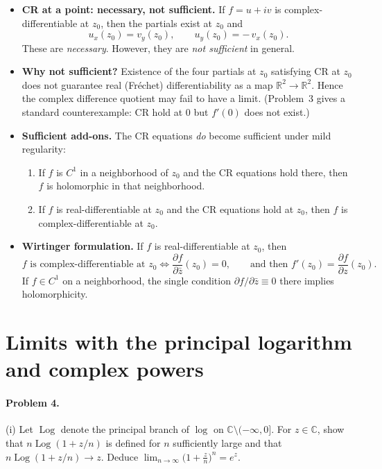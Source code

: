 \documentclass[11pt,a4paper]{article}
\theoremstyle{definition}
\theoremstyle{definition}
\theoremstyle{plain}
\theoremstyle{remark}
\DeclareMathOperator{\Log}{Log}
\begin{document}
\begin{itemize}
	\item \textbf{CR at a point: necessary, not sufficient.}
	If $f=u+iv$ is complex-differentiable at $z_0$, then the partials exist at $z_0$ and
	\[
	u_x(z_0)=v_y(z_0),\qquad u_y(z_0)=-\,v_x(z_0).
	\]
	These are \emph{necessary}. However, they are \emph{not sufficient} in general.
	
	\item \textbf{Why not sufficient?}
	Existence of the four partials at $z_0$ satisfying CR at $z_0$ does not guarantee real (Fr\'echet)
	differentiability as a map $\mathbb{R}^2\!\to\!\mathbb{R}^2$. Hence the complex difference quotient
	may fail to have a limit. (Problem~3 gives a standard counterexample: CR hold at $0$ but $f'(0)$ does not exist.)
	
	\item \textbf{Sufficient add-ons.} The CR equations \emph{do} become sufficient under mild regularity:
	\begin{enumerate}
		\item If $f$ is $C^1$ in a neighborhood of $z_0$ and the CR equations hold there, then $f$ is holomorphic
		in that neighborhood.
		\item If $f$ is real-differentiable at $z_0$ and the CR equations hold at $z_0$, then $f$ is complex-differentiable at $z_0$.
	\end{enumerate}
	
	\item \textbf{Wirtinger formulation.}
	If $f$ is real-differentiable at $z_0$, then
	\[
	f \text{ is complex-differentiable at } z_0
	\iff \frac{\partial f}{\partial \bar z}(z_0)=0,
	\qquad \text{and then } f'(z_0)=\frac{\partial f}{\partial z}(z_0).
	\]
	If $f\in C^1$ on a neighborhood, the single condition $\partial f/\partial \bar z\equiv0$ there implies holomorphicity.
\end{itemize}

\section*{Limits with the principal logarithm and complex powers}

\paragraph{Problem 4.}
(i) Let $\Log$ denote the principal branch of $\log$ on $\mathbb C\setminus(-\infty,0]$.
For $z\in\mathbb C$, show that $n\Log(1+z/n)$ is defined for $n$ sufficiently large and that
$n\Log(1+z/n)\to z$. Deduce $\displaystyle\lim_{n\to\infty}\bigl(1+\frac{z}{n}\bigr)^n=e^{z}$.
\smallskip
\end{document}

